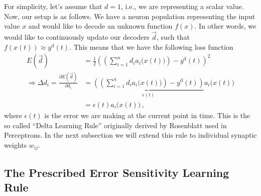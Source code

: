 \documentclass[10pt,letterpaper,oneside]{article}
\begin{document}
For simplicity, let's assume that $d = 1$, i.e., we are representing a scalar value. Now, our setup is as follows. We have a neuron population representing the input value $x$ and would like to decode an unknown function $f(x)$. In other words, we would like to continuously update our decoders $\vec d$, such that $f(x(t)) \approx y^\mathrm{d}(t)$. This means that we have the following loss function
\begin{align*}
	E(\vec d) &= \frac{1}2 \left(\left(\sum_{i = 1}^n d_i a_i\big(x(t)\big) \right) - y^\mathrm{d}(t) \right)^2 \\
	\Rightarrow \Delta d_i = \frac{\partial E(\vec d)}{\partial d_i} &= \underbrace{\left(\left(\sum_{i = 1}^n d_i a_i\big(x(t)\big) \right) - y^\mathrm{d}(t)\right)}_{\epsilon(t)} a_i\big(x(t)\big) \\
		&= \epsilon(t) a_i\big(x(t)\big) \,,
\end{align*}
where $\epsilon(t)$ is the error we are making at the current point in time. This is the so called \enquote{Delta Learning Rule} originally derived by Rosenblatt used in Perceptrons. In the next subsection we will extend this rule to individual synaptic weights $w_{ij}$.



\subsection{The Prescribed Error Sensitivity Learning Rule}
\end{document}
